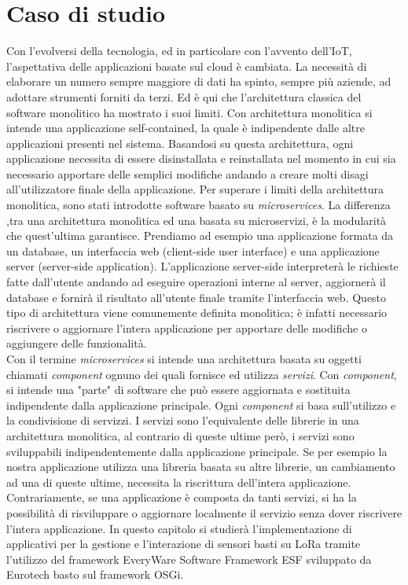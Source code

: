 \chapter{Caso di studio}
Con l'evolversi della tecnologia, ed in particolare con l'avvento dell'IoT,
l'aspettativa delle applicazioni basate sul cloud è cambiata. La necessità di
elaborare un numero sempre maggiore di dati ha spinto, sempre più aziende, ad
adottare strumenti forniti da terzi.  Ed è qui che l'architettura classica del
software monolitico ha mostrato i suoi limiti. Con architettura monolitica si
intende una applicazione self-contained, la quale è indipendente dalle altre
applicazioni presenti nel sistema.  Basandosi su questa architettura, ogni
applicazione necessita di essere disinstallata e reinstallata nel momento in cui
sia necessario apportare delle semplici modifiche andando a creare molti disagi
all'utilizzatore finale della applicazione.  Per superare i limiti della
architettura monolitica, sono stati introdotte software basato su
\emph{microservices}.  La differenza ,tra una architettura monolitica ed una
basata su microservizi, è la  modularità che quest'ultima garantisce.  Prendiamo
ad esempio una applicazione formata da un database, un interfaccia web
(client-side user interface)  e una applicazione server (server-side
application).  L'applicazione server-side interpreterà le richieste fatte
dall'utente andando ad eseguire operazioni interne al server, aggiornerà il
database e fornirà il risultato all'utente finale tramite l'interfaccia web.
Questo tipo di architettura viene comunemente definita monolitica; è infatti
necessario riscrivere o aggiornare l'intera applicazione per apportare delle
modifiche o aggiungere delle funzionalità.\\ Con il termine \emph{microservices}
si intende una architettura basata su oggetti chiamati \emph{component} ognuno
dei quali fornisce ed utilizza \emph{servizi}.  Con \emph{component}, si intende
una "parte" di software che può essere aggiornata e sostituita indipendente
dalla applicazione principale.  Ogni \emph{component} si basa sull'utilizzo e la
condivisione di servizzi.  I servizi sono l'equivalente delle librerie in una
architettura monolitica, al contrario di queste ultime però, i servizi sono
sviluppabili indipendentemente dalla applicazione principale. Se per esempio la
nostra applicazione utilizza una libreria basata su  altre librerie, un
cambiamento ad una di queste ultime, necessita la riscrittura dell'intera
applicazione.  Contrariamente, se una applicazione è composta da tanti servizi,
si ha la possibilità di risviluppare o aggiornare localmente il servizio senza
dover riscrivere l'intera applicazione. In questo capitolo si studierà
l'implementazione di applicativi per la gestione e l'interazione di sensori
basti su LoRa tramite l'utilizzo del framework EveryWare Software Framework ESF
sviluppato da Eurotech basto sul framework OSGi.
